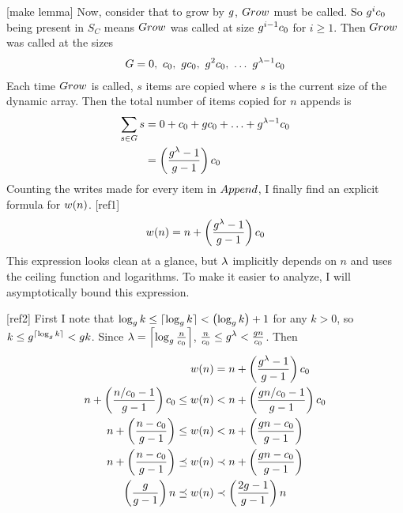 [make lemma]
Now, consider that to grow by $g$, $Grow$ must be called. So $g^ic_0$ being present in $S_C$ means $Grow$ was called at size $g^{i - 1}c_0$ for $i \geq 1$. Then $Grow$ was called at the sizes
\begin{align*}
\VarGrowSeq = 0,\ \VarInitCapacity,\ \VarGrowthFactor\VarInitCapacity,\ \VarGrowthFactor^2\VarInitCapacity,\ \ldots\ \VarGrowthFactor^{\VarUseful - 1}\VarInitCapacity
\end{align*}
Each time $Grow$ is called, $s$ items are copied where $s$ is the current size of the dynamic array. Then the total number of items copied for $n$ appends is
\begin{align*}
\sum_{s \in G} s &= 0 + c_0 + gc_0 + \ldots + g^{\lambda - 1}c_0\\
&= \left( \frac{g^{\lambda} - 1}{g - 1} \right) c_0
\end{align*}
Counting the writes made for every item in $Append$, I finally find an explicit formula for $w(n)$.
[ref1]
\begin{align*}
w(n) = n + \left( \frac{g^\lambda - 1}{g - 1} \right) c_0
\end{align*}
This expression looks clean at a glance, but $\lambda$ implicitly depends on $n$ and uses the ceiling function and logarithms. To make it easier to analyze, I will asymptotically bound this expression.

[ref2]
First I note that $\log_{g} k \leq \lceil \log_{g} k \rceil < \left( \log_{g} k \right) + 1$ for any $k > 0$, so $k \leq g^{\lceil \log_{g} k \rceil} < g{k}$. Since $\lambda = \left\lceil \log_{g} \frac{n}{c_0} \right\rceil$, $\frac n {c_0} \leq g^\lambda < \frac {g{n}} {c_0}$. Then
\begin{align*}
w(n) &= n + \left( \frac{g^\lambda - 1}{g - 1} \right) c_0\\
n + \left( \frac{n / c_0 - 1}{g - 1} \right) c_0 \leq w(n) &< n + \left( \frac{g{n} / c_0 - 1}{g - 1} \right) c_0\\
n + \left( \frac{n - c_0}{g - 1} \right) \leq w(n) &< n + \left( \frac{g{n} - c_0}{g - 1} \right)\\
n + \left( \frac{n - c_0}{g - 1} \right) \preceq w(n) &\prec n + \left( \frac{g{n} - c_0}{g - 1} \right)\\
\left( \frac{g}{g - 1} \right) n \preceq w(n) &\prec \left( \frac{2g - 1}{g - 1} \right) n
\end{align*}

